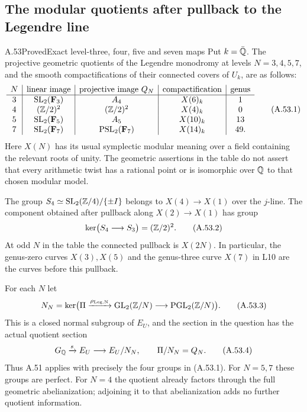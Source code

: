 \subsection{The modular quotients after pullback to the Legendre line}

\begin{statement}{A.53}{Proved}{Exact level-three, four, five and seven maps}
Put $k=\bar{\mathbb Q}$.  The projective geometric quotients of the Legendre
monodromy at levels $N=3,4,5,7$, and the smooth compactifications of
their connected covers of $U_k$, are as follows:
\[
\begin{array}{c|c|c|c|c}
N&\text{linear image}&\text{projective image }Q_N
 &\text{compactification}&\text{genus}\\ \hline
3&\operatorname{SL}_2(\mathbf F_3)&A_4&X(6)_k&1\\
4& (\mathbb Z/2)^2&(\mathbb Z/2)^2&X(4)_k&0\\
5&\operatorname{SL}_2(\mathbf F_5)&A_5&X(10)_k&13\\
7&\operatorname{SL}_2(\mathbf F_7)&
       \operatorname{PSL}_2(\mathbf F_7)&X(14)_k&49.
\end{array}
\tag{A.53.1}
\]
Here $X(N)$ has its usual symplectic modular meaning over a field
containing the relevant roots of unity.  The geometric assertions in
the table do not assert that every arithmetic twist has a rational
point or is isomorphic over $\mathbb Q$ to that chosen modular model.

The group $S_4\simeq\operatorname{SL}_2(\mathbb Z/4)/\{\pm I\}$ belongs to
$X(4)\to X(1)$ over the $j$-line.  The component obtained after
pullback along $X(2)\to X(1)$ has group
\[
 \ker\bigl(S_4\longrightarrow S_3\bigr)=(\mathbb Z/2)^2.
\tag{A.53.2}
\]
At odd $N$ in the table the connected pullback is $X(2N)$.
In particular, the genus-zero curves $X(3),X(5)$ and the genus-three
curve $X(7)$ in L10 are the curves before this pullback.

For each $N$ let
\[
 N_N=\ker\bigl(\Pi\xrightarrow{\rho_{\rm Leg,N}}
      \operatorname{GL}_2(\mathbb Z/N)\longrightarrow
      \operatorname{PGL}_2(\mathbb Z/N)\bigr).
\tag{A.53.3}
\]
This is a closed normal subgroup of $E_U$, and the section in the
question has the actual quotient section
\[
       G_\mathbb Q\xrightarrow{s}E_U\longrightarrow E_U/N_N,
       \qquad \Pi/N_N=Q_N.
\tag{A.53.4}
\]
Thus A.51 applies with precisely the four groups in (A.53.1).
For $N=5,7$ these groups are perfect.  For $N=4$ the quotient
already factors through the full geometric abelianization; adjoining
it to that abelianization adds no further quotient information.
\end{statement}
